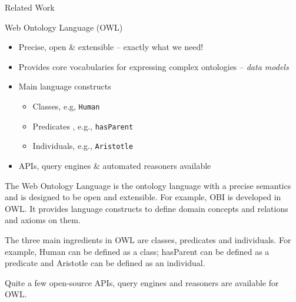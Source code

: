 \documentclass[ignorenonframetext,compress]{beamer}
\begin{document}
\begin{frame}{Related Work}
\begin{block}{Web Ontology Language (OWL)}
\begin{itemize}
    \item Precise, open \& extensible -- exactly what we need!
    \item Provides core vocabularies for expressing complex ontologies -- \emph{data models}
    \item Main language constructs
    \begin{itemize}
        \item Classes, e.g, \texttt{Human}
        \item Predicates , e.g., \texttt{hasParent}
        \item Individuals, e.g., \texttt{Aristotle}
    \end{itemize}
    \item APIs, query engines \& automated reasoners available
\end{itemize}
\end{block}
\end{frame}

The Web Ontology Language is the ontology language with a precise semantics 
and is designed to be open and extensible. For example, OBI is developed
in OWL. It provides language constructs to define domain concepts and relations
and axioms on them. 

The three main ingredients in OWL are classes, predicates and individuals. 
For example, Human can be defined as a class; hasParent can be defined as
a predicate and Aristotle can be defined as an individual. 

Quite a few open-source APIs, query engines and reasoners are available for OWL. 
\end{document}
